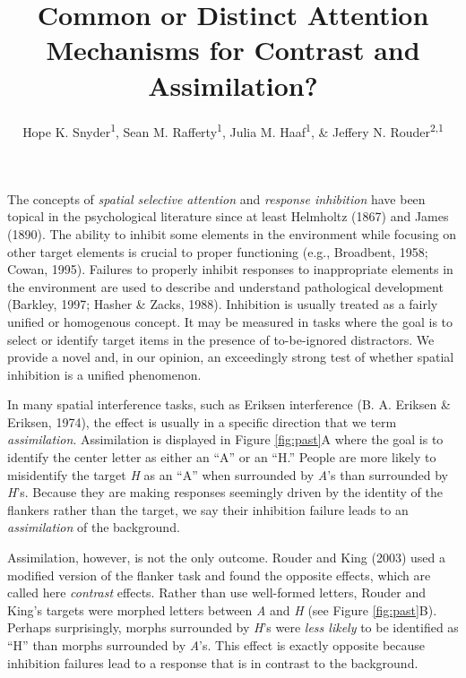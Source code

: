 \documentclass[english,floatsintext,man]{apa6}
\title{Common or Distinct Attention Mechanisms for Contrast and Assimilation?}
\author{Hope K. Snyder\textsuperscript{1}, Sean M. Rafferty\textsuperscript{1}, Julia M. Haaf\textsuperscript{1}, \& Jeffery N. Rouder\textsuperscript{2,1}}
\affiliation{
    \vspace{0.5cm}
          \textsuperscript{1} University of Missouri\\
          \textsuperscript{2} University of California, Irvine  }
\theoremstyle{definition}
\theoremstyle{definition}
\theoremstyle{definition}
\theoremstyle{remark}
\begin{document}
\maketitle

\setcounter{secnumdepth}{0}



The concepts of \emph{spatial selective attention} and \emph{response
inhibition} have been topical in the psychological literature since at
least Helmholtz (1867) and James (1890). The ability to inhibit some
elements in the environment while focusing on other target elements is
crucial to proper functioning (e.g., Broadbent, 1958; Cowan, 1995).
Failures to properly inhibit responses to inappropriate elements in the
environment are used to describe and understand pathological development
(Barkley, 1997; Hasher \& Zacks, 1988). Inhibition is usually treated as
a fairly unified or homogenous concept. It may be measured in tasks
where the goal is to select or identify target items in the presence of
to-be-ignored distractors. We provide a novel and, in our opinion, an
exceedingly strong test of whether spatial inhibition is a unified
phenomenon.

In many spatial interference tasks, such as Eriksen interference (B. A.
Eriksen \& Eriksen, 1974), the effect is usually in a specific direction
that we term \emph{assimilation}. Assimilation is displayed in Figure
\ref{fig:past}A where the goal is to identify the center letter as
either an \enquote{A} or an \enquote{H.} People are more likely to
misidentify the target \emph{H} as an \enquote{A} when surrounded by
\emph{A}'s than surrounded by \emph{H}'s. Because they are making
responses seemingly driven by the identity of the flankers rather than
the target, we say their inhibition failure leads to an
\emph{assimilation} of the background.

Assimilation, however, is not the only outcome. Rouder and King (2003)
used a modified version of the flanker task and found the opposite
effects, which are called here \emph{contrast} effects. Rather than use
well-formed letters, Rouder and King's targets were morphed letters
between \emph{A} and \emph{H} (see Figure \ref{fig:past}B). Perhaps
surprisingly, morphs surrounded by \emph{H}'s were \emph{less likely} to
be identified as \enquote{H} than morphs surrounded by \emph{A}'s. This
effect is exactly opposite because inhibition failures lead to a
response that is in contrast to the background.
\end{document}
